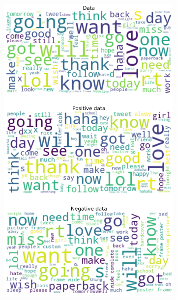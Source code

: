 \documentclass{article}
\begin{document}
\begin{itemize}
\begin{figure}[H]
\begin{subfigure}[b]{0.24\textwidth}
\includegraphics[width=\textwidth]{chapter-06/section-01-01/07/visualization/2/wordcloud.png}
\end{subfigure}
\begin{subfigure}[b]{0.24\textwidth}
\centering

\end{subfigure}
\end{figure}
\end{itemize}
\end{document}
